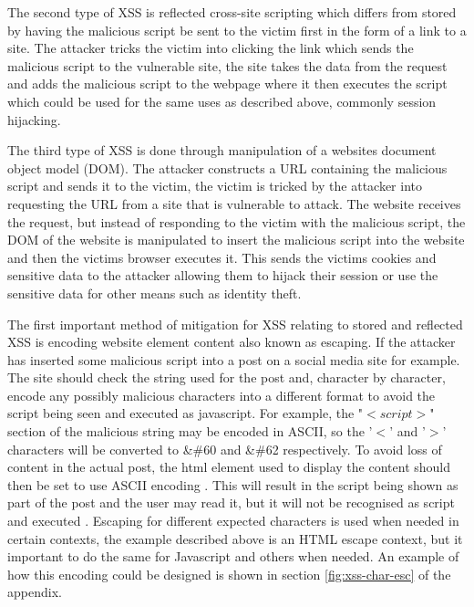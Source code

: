 \documentclass{ueacmpstyle}
\begin{document}
      The second type of XSS is reflected cross-site scripting which differs from stored 
      by having the malicious script be sent to the victim first in the form of a link to 
      a site. The attacker tricks the victim into clicking the link which sends the 
      malicious script to the vulnerable site, the site takes the data from the request and 
      adds the malicious script to the webpage where it then executes the script which could 
      be used for the same uses as described above, commonly session hijacking.

      The third type of XSS is done through manipulation of a websites document object model 
      (DOM). The attacker constructs a URL containing the malicious script and sends it to 
      the victim, the victim is tricked by the attacker into requesting the URL from a site 
      that is vulnerable to attack. The website receives the request, but instead of 
      responding to the victim with the malicious script, the DOM of the website is manipulated 
      to insert the malicious script into the website and then the victims browser executes it. 
      This sends the victims cookies and sensitive data to the attacker allowing them to hijack 
      their session or use the sensitive data for other means such as identity theft.

      The first important method of mitigation for XSS relating to stored and reflected XSS is 
      encoding website element content also known as escaping. If the attacker has inserted 
      some malicious script into a post on a social media site for example. The site should 
      check the string used for the post and, character by character, encode any possibly 
      malicious characters into a different format to avoid the script being seen and 
      executed as javascript. For example, the "$<script>$" section of the malicious string 
      may be encoded in ASCII, so the '$<$' and '$>$' characters will be converted to \&\#60 
      and \&\#62 respectively. To avoid loss of content in the actual post, the html element 
      used to display the content should then be set to use ASCII encoding . This will result 
      in the script being shown as part of the post and the user may read it, but it will not 
      be recognised as script and executed \citep{IBMProtectFromXSS}. Escaping for different 
      expected characters is used when needed in certain contexts, the example described 
      above is an HTML escape context, but it important to do the same for Javascript and 
      others when needed. An example of how this encoding could be designed is shown in 
      section \ref{fig:xss-char-esc} of the appendix. 
\end{document}
